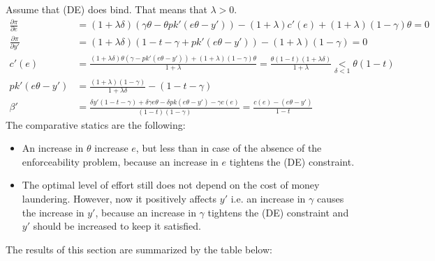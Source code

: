 \documentclass[a4paper]{article}
\begin{document}
Assume that (DE) does bind. That means that $\lambda > 0$.
\begin{align*}
\frac{\partial \pi}{\partial e} &= (1 + \lambda \delta)(\gamma \theta - \theta p k'(e \theta - y')) - (1+\lambda)c'(e) + (1+\lambda)(1-\gamma)\theta = 0\\
\frac{\partial \pi}{\partial y'} &= (1+\lambda \delta)(1 - t - \gamma+pk'(e\theta - y')) - (1+\lambda)(1-\gamma) = 0\\
c'(e) &= \frac{(1+\lambda \delta)\theta(\gamma - pk'(e \theta - y'))+ (1+\lambda)(1-\gamma)\theta}{1+\lambda} = \frac{\theta(1-t)(1 + \lambda \delta)}{1+\lambda}\underset{\delta < 1}{<} \theta(1-t)\\
pk'(e\theta - y') &= \frac{(1+\lambda)(1-\gamma)}{1+\lambda \delta} - (1 - t - \gamma)\\
\beta' &= \frac{\delta y'(1 - t - \gamma) + \delta \gamma e \theta - \delta p k(e \theta - y') - \gamma c(e)}{(1-t)(1-\gamma)} = \frac{c(e) - (e \theta - y')}{1-t}
\end{align*}
The comparative statics are the following:
\begin{itemize}
\item An increase in $\theta$ increase $e$, but less than in case of the absence of the enforceability problem, because an increase in $e$ tightens the (DE) constraint.
\item The optimal level of effort still does not depend on the cost of money laundering. However, now it positively affects $y'$ i.e. an increase in $\gamma$ causes the increase in $y'$, because an increase in $\gamma$ tightens the (DE) constraint and $y'$ should be increased to keep it satisfied.
\end{itemize}
The results of this section are summarized by the table below:
\end{document}
